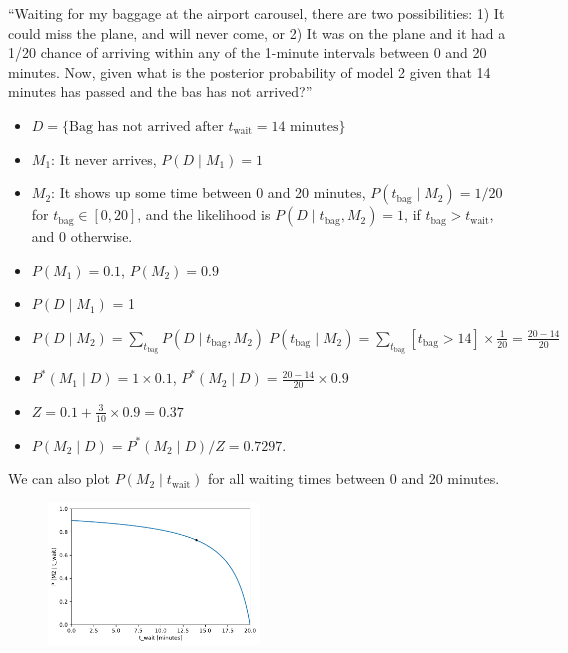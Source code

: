 ``Waiting for my baggage at the airport carousel, there are two possibilities: 1) It could miss the plane, and will never come, or 2) It was on the plane and it had a 1/20 chance of arriving within any of the 1-minute intervals between 0 and 20 minutes. Now, given what is the posterior probability of model 2 given that 14 minutes has passed and the bas has not arrived?''
\begin{itemize}
	\item $D = \{\text{Bag has not arrived after } t_\text{wait}=14 \text{ minutes}\}$
	\item $M_1$: It never arrives, $P(D\;|\;M_1) = 1$
	\item $M_2$: It shows up some time between 0 and 20 minutes, $P(t_\text{bag}\;|\;M_2) = 1/20$ for $t_\text{bag} \in [0, 20]$, and the likelihood is $P(D\;|\;t_\text{bag}, M_2) = 1$, if $t_\text{bag} > t_\text{wait}$, and 0 otherwise.
	\item $P(M_1) = 0.1$, \quad $P(M_2)= 0.9$
	\item $P(D\;|\;M_1)$ = 1
	\item $P(D\;|\;M_2) = \sum_{t_\text{bag}} P(D\;|\;t_\text{bag}, M_2) \;P(t_\text{bag}\;|\;M_2) = \sum_{t_\text{bag}} [t_\text{bag} > 14] \times\frac{1}{20} = \frac{20 - 14}{20}$
	\item $P^\ast(M_1\;|\;D) = 1 \times 0.1$, \quad $P^\ast(M_2\;|\;D) = \frac{20 - 14}{20}\times 0.9$
	\item $Z = 0.1 + \frac{3}{10}\times 0.9 = 0.37$
	\item $P(M_2\;|\;D) = P^\ast(M_2\;|\;D) / Z = 0.7297$.
\end{itemize}
We can also plot $P(M_2\;|\;t_\text{wait})$ for all waiting times between 0 and 20 minutes.
\begin{figure}[h]
	\centering
	\includegraphics[width=0.5\textwidth]{figs/Baggage_wait.pdf}
\end{figure}


